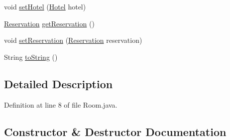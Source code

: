\begin{DoxyCompactItemize}
\item 
void \mbox{\hyperlink{classbspq18__e4_1_1_gestion_hotelera_1_1server_1_1data_1_1_room_a12b81a63492eb97210f7964a130def48}{set\+Hotel}} (\mbox{\hyperlink{classbspq18__e4_1_1_gestion_hotelera_1_1server_1_1data_1_1_hotel}{Hotel}} hotel)
\item 
\mbox{\hyperlink{classbspq18__e4_1_1_gestion_hotelera_1_1server_1_1data_1_1_reservation}{Reservation}} \mbox{\hyperlink{classbspq18__e4_1_1_gestion_hotelera_1_1server_1_1data_1_1_room_a0f5648530ef36f0dba64125f5784cd9a}{get\+Reservation}} ()
\item 
void \mbox{\hyperlink{classbspq18__e4_1_1_gestion_hotelera_1_1server_1_1data_1_1_room_a3f1c78186da12a5c44d67f43e51f3b1b}{set\+Reservation}} (\mbox{\hyperlink{classbspq18__e4_1_1_gestion_hotelera_1_1server_1_1data_1_1_reservation}{Reservation}} reservation)
\item 
String \mbox{\hyperlink{classbspq18__e4_1_1_gestion_hotelera_1_1server_1_1data_1_1_room_a7e990a7117931a098256fee23b36c37b}{to\+String}} ()
\end{DoxyCompactItemize}


\subsection{Detailed Description}


Definition at line 8 of file Room.\+java.



\subsection{Constructor \& Destructor Documentation}
\mbox{\label{classbspq18__e4_1_1_gestion_hotelera_1_1server_1_1data_1_1_room_abbb03f3a42b6e7d67d66335d7230d888}} 
